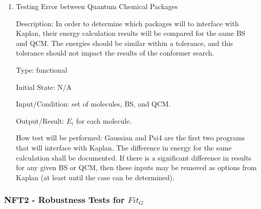 \documentclass[12pt, titlepage]{article}
\newcommand{\progname}{Kaplan} %
\begin{document}
\begin{enumerate}
\item Testing Error between Quantum Chemical Packages

Description: In order to determine which packages will to interface with 
\progname{}, their energy calculation results will be compared for the same BS 
and QCM. The energies should be similar within a tolerance, and this tolerance 
should not impact the results of the conformer search.

Type: functional
					
Initial State: N/A
					
Input/Condition: set of molecules, BS, and QCM.
					
Output/Result: $E_i$ for each molecule.
					
How test will be performed: Gaussian and Psi4 are the first two programs that 
will interface with \progname{}. The difference in energy for the same 
calculation shall be documented. If there is a significant difference in 
results for any given BS or QCM, then these inputs may be removed as options 
from \progname{} (at least until the case can be determined).

\end{enumerate}

\subsubsection{NFT2 - Robustness Tests for $Fit_G$}
\end{document}
